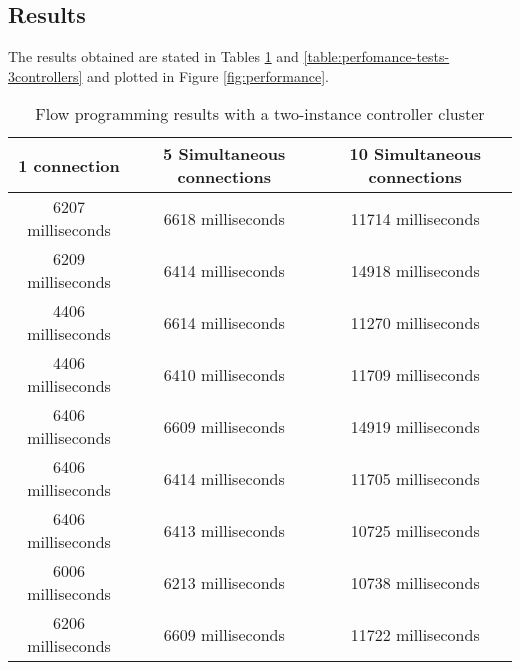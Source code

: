 \subsection{Results}
\label{subsection:performance-tests-results}
%
The results obtained are stated in Tables \ref{table:perfomance-tests-2controllers} and \ref{table:perfomance-tests-3controllers} and plotted in Figure \ref{fig:performance}.
%
\begin{table}[h!]
	\begin{center}
		\begin{tabular}{ | c | c | c | }
			\rowcolor{HeaderRowColor}
			\hline
			\textbf{1 connection} & \textbf{5 Simultaneous connections} & \textbf{10 Simultaneous connections}\\
			\hline
			6207 milliseconds & 6618 milliseconds & 11714 milliseconds \\
			\hline
			6209 milliseconds & 6414 milliseconds & 14918 milliseconds \\
			\hline
			4406 milliseconds & 6614 milliseconds & 11270 milliseconds \\
			\hline
			4406 milliseconds & 6410 milliseconds & 11709 milliseconds \\
			\hline
			6406 milliseconds & 6609 milliseconds & 14919 milliseconds \\
			\hline
			6406 milliseconds & 6414 milliseconds & 11705 milliseconds \\
			\hline
			6406 milliseconds & 6413 milliseconds & 10725 milliseconds \\
			\hline
			6006 milliseconds & 6213 milliseconds & 10738 milliseconds \\
			\hline
			6206 milliseconds & 6609 milliseconds & 11722 milliseconds \\
			\hline
		\end{tabular}
		\caption{Flow programming results with a two-instance controller cluster}
		\label{table:perfomance-tests-2controllers}
	\end{center}
\end{table}
%
